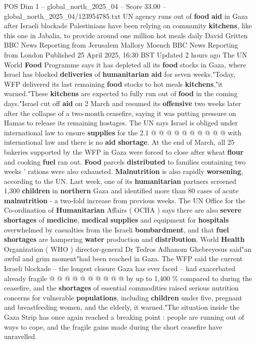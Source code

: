 \begin{textsample}{POS Dim 1 – global\_north\_2025\_04 – Score 33.00 – global\_north\_2025\_04/123954785.txt}  \label{ex:f1_pos_344}
UN agency runs out of \textbf{food} \textbf{aid} in Gaza after Israeli blockade Palestinians have been relying on community \textbf{kitchens}, like this one in Jabalia, to provide around one million hot meals daily David Gritten BBC News Reporting from Jerusalem Mallory Moench BBC News Reporting from London Published 25 April 2025, 16:30 BST Updated 2 hours ago The UN World \textbf{Food} Programme says it has depleted all its \textbf{food} stocks in Gaza, where Israel has blocked \textbf{deliveries} of \textbf{humanitarian} \textbf{aid} for seven weeks."Today, WFP delivered its last remaining \textbf{food} stocks to hot meals \textbf{kitchens},"it warned."These \textbf{kitchens} are expected to fully run out of \textbf{food} in the coming days."Israel cut off \textbf{aid} on 2 March and resumed its \textbf{offensive} two weeks later after the collapse of a two-month ceasefire, saying it was putting pressure on Hamas to release its remaining hostages.
The UN says Israel is obliged under international law to ensure \textbf{supplies} for the 2.1 @ @ @ @ @ @ @ @ @ @ with international law and there is no \textbf{aid} \textbf{shortage}.
At the end of March, all 25 bakeries supported by the WFP in Gaza were forced to close after wheat \textbf{flour} and cooking \textbf{fuel} ran out. \textbf{Food} parcels \textbf{distributed} to families containing two weeks ' rations were also exhausted. \textbf{Malnutrition} is also rapidly \textbf{worsening}, according to the UN.
Last week, one of its \textbf{humanitarian} partners screened 1,300 \textbf{children} in \textbf{northern} Gaza and identified more than 80 cases of acute \textbf{malnutrition} - a two-fold increase from previous weeks.
The UN Office for the Co-ordination of \textbf{Humanitarian} Affairs ( OCHA ) says there are also \textbf{severe} \textbf{shortages} of \textbf{medicine}, \textbf{medical} \textbf{supplies} and equipment for \textbf{hospitals} overwhelmed by casualties from the Israeli \textbf{bombardment}, and that \textbf{fuel} \textbf{shortages} are hampering \textbf{water} production and \textbf{distribution}.
World \textbf{Health} Organization ( WHO ) director-general Dr Tedros Adhanom Ghebreyesus said"an awful and grim moment"had been reached in Gaza.
The WFP said the current Israeli blockade -- the longest closure Gaza has ever faced -- had exacerbated already fragile @ @ @ @ @ @ @ @ @ @ by up to 1,400 \% compared to during the ceasefire, and the \textbf{shortages} of essential commodities raised serious nutrition concerns for vulnerable \textbf{populations}, including \textbf{children} under five, pregnant and breastfeeding women, and the elderly, it warned."The situation inside the Gaza Strip has once again reached a breaking point : people are running out of ways to cope, and the fragile gains made during the short ceasefire have unravelled.

\end{textsample}
